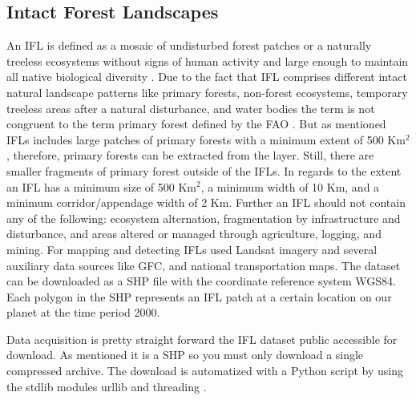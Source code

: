 	\subsection{Intact Forest Landscapes}
		An \ac{IFL} is defined as a mosaic of undisturbed forest patches or a naturally treeless ecosystems without signs of human activity and large enough to maintain all native biological diversity \citep{Potapov2017}. Due to the fact that \ac{IFL} comprises different intact natural landscape patterns like primary forests, non-forest ecosystems, temporary treeless areas after a natural disturbance, and water bodies the term is not congruent to the term primary forest defined by the \ac{FAO} \citep{FAO2012}. But as mentioned \ac{IFL}s includes large patches of primary forests with a minimum extent of 500 Km$^2$, therefore, primary forests can be extracted from the layer. Still, there are smaller fragments of primary forest outside of the \ac{IFL}s. In regards to the extent an \ac{IFL} has a minimum size of 500 Km$^2$, a minimum width of 10 Km, and a minimum corridor/appendage width of 2 Km. Further an \ac{IFL} should not contain any of the following: ecosystem alternation, fragmentation by infrastructure and disturbance, and areas altered or managed through agriculture, logging, and mining. For mapping and detecting \ac{IFL}s \citeauthor{Potapov2017} used Landsat imagery and several auxiliary data sources like \ac{GFC}, and national transportation maps. The dataset can be downloaded as a \ac{SHP} file with the coordinate reference system \ac{WGS84}. Each polygon in the \ac{SHP} represents an \ac{IFL} patch at a certain location on our planet at the time period 2000.

		Data acquisition is pretty straight forward the \ac{IFL} dataset public accessible for download. As mentioned it is a \ac{SHP} so you must only download a single compressed archive. The download is automatized with a Python script by using the \ac{stdlib} modules urllib and threading \citep{Rossum2018}.

